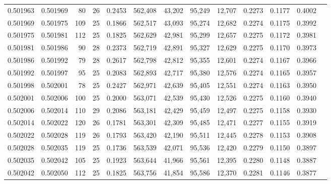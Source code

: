 \begin{tabular}{rrrrrrrrrrrrr}
0.501963 & 0.501969 &  80 &  26 &                                     0.2453 & 562,408 &  43,202 &  95,249 &  12,707 & 0.2273 & 0.1177 & 0.4002 \\
0.501969 & 0.501975 & 109 &  25 &                                     0.1866 & 562,517 &  43,093 &  95,274 &  12,682 & 0.2274 & 0.1175 & 0.3992 \\
0.501975 & 0.501981 & 112 &  25 &                                     0.1825 & 562,629 &  42,981 &  95,299 &  12,657 & 0.2275 & 0.1172 & 0.3981 \\
0.501981 & 0.501986 &  90 &  28 &                                     0.2373 & 562,719 &  42,891 &  95,327 &  12,629 & 0.2275 & 0.1170 & 0.3973 \\
0.501986 & 0.501992 &  79 &  28 &                                     0.2617 & 562,798 &  42,812 &  95,355 &  12,601 & 0.2274 & 0.1167 & 0.3966 \\
0.501992 & 0.501997 &  95 &  25 &                                     0.2083 & 562,893 &  42,717 &  95,380 &  12,576 & 0.2274 & 0.1165 & 0.3957 \\
0.501998 & 0.502001 &  78 &  25 &                                     0.2427 & 562,971 &  42,639 &  95,405 &  12,551 & 0.2274 & 0.1163 & 0.3950 \\
0.502001 & 0.502006 & 100 &  25 &                                     0.2000 & 563,071 &  42,539 &  95,430 &  12,526 & 0.2275 & 0.1160 & 0.3940 \\
0.502006 & 0.502014 & 110 &  29 &                                     0.2086 & 563,181 &  42,429 &  95,459 &  12,497 & 0.2275 & 0.1158 & 0.3930 \\
0.502014 & 0.502022 & 120 &  26 &                                     0.1781 & 563,301 &  42,309 &  95,485 &  12,471 & 0.2277 & 0.1155 & 0.3919 \\
0.502022 & 0.502028 & 119 &  26 &                                     0.1793 & 563,420 &  42,190 &  95,511 &  12,445 & 0.2278 & 0.1153 & 0.3908 \\
0.502028 & 0.502035 & 119 &  25 &                                     0.1736 & 563,539 &  42,071 &  95,536 &  12,420 & 0.2279 & 0.1150 & 0.3897 \\
0.502035 & 0.502042 & 105 &  25 &                                     0.1923 & 563,644 &  41,966 &  95,561 &  12,395 & 0.2280 & 0.1148 & 0.3887 \\
0.502042 & 0.502050 & 112 &  25 &                                     0.1825 & 563,756 &  41,854 &  95,586 &  12,370 & 0.2281 & 0.1146 & 0.3877 \\

\end{tabular}
